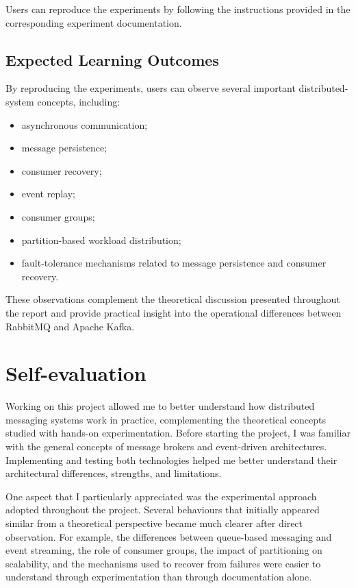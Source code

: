 \documentclass{scrartcl}
\begin{document}
Users can reproduce the experiments by following the instructions provided in the corresponding experiment documentation.

\subsection{Expected Learning Outcomes}

By reproducing the experiments, users can observe several important distributed-system concepts, including:

\begin{itemize}
\item asynchronous communication;
\item message persistence;
\item consumer recovery;
\item event replay;
\item consumer groups;
\item partition-based workload distribution;
\item fault-tolerance mechanisms related to message persistence and consumer recovery.
\end{itemize}

These observations complement the theoretical discussion presented throughout the report and provide practical insight into the operational differences between RabbitMQ and Apache Kafka.


\section{Self-evaluation}\label{self-evaluation}

Working on this project allowed me to better understand how distributed messaging systems work in practice, complementing the theoretical concepts studied with hands-on experimentation. Before starting the project, I was familiar with the general concepts of message brokers and event-driven architectures. Implementing and testing both technologies helped me better understand their architectural differences, strengths, and limitations.

One aspect that I particularly appreciated was the experimental approach adopted throughout the project. Several behaviours that initially appeared similar from a theoretical perspective became much clearer after direct observation. For example, the differences between queue-based messaging and event streaming, the role of consumer groups, the impact of partitioning on scalability, and the mechanisms used to recover from failures were easier to understand through experimentation than through documentation alone.
\end{document}
